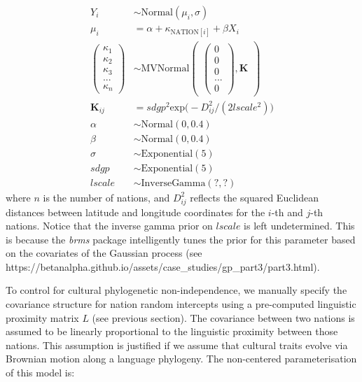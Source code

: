 \begin{appendix}
\[
\begin{aligned}
Y_{i} &\sim \text{Normal}(\mu_{i},\sigma) \\
\mu_{i} &= \alpha + \kappa_{\text{NATION}[i]} + \beta X_{i} \\
\begin{pmatrix}
\kappa_{1} \\ \kappa_{2} \\ \kappa_{3} \\ ... \\ \kappa_{n}
\end{pmatrix} &\sim \text{MVNormal}
\begin{pmatrix}
\begin{pmatrix}
0 \\ 0 \\ 0 \\ ... \\ 0
\end{pmatrix},\textbf{K}
\end{pmatrix}\\
\textbf{K}_{ij} &= sdgp^2 \text{exp} \big (-D_{ij}^2 / (2 lscale^2) \big )\\
\alpha &\sim \text{Normal}(0, 0.4) \\
\beta &\sim \text{Normal}(0, 0.4) \\
\sigma &\sim \text{Exponential}(5) \\
sdgp &\sim \text{Exponential}(5) \\
lscale &\sim \text{InverseGamma}(?,?)
\end{aligned}
\] where \(n\) is the number of nations, and \(D^2_{ij}\) reflects the
squared Euclidean distances between latitude and longitude coordinates
for the \(i\)-th and \(j\)-th nations. Notice that the inverse gamma
prior on \(lscale\) is left undetermined. This is because the
\emph{brms} package intelligently tunes the prior for this parameter
based on the covariates of the Gaussian process (see
https://betanalpha.github.io/assets/case\_studies/gp\_part3/part3.html).

\newpage

To control for cultural phylogenetic non-independence, we manually
specify the covariance structure for nation random intercepts using a
pre-computed linguistic proximity matrix \(L\) (see previous section).
The covariance between two nations is assumed to be linearly
proportional to the linguistic proximity between those nations. This
assumption is justified if we assume that cultural traits evolve via
Brownian motion along a language phylogeny. The non-centered
parameterisation of this model is:


\end{appendix}
